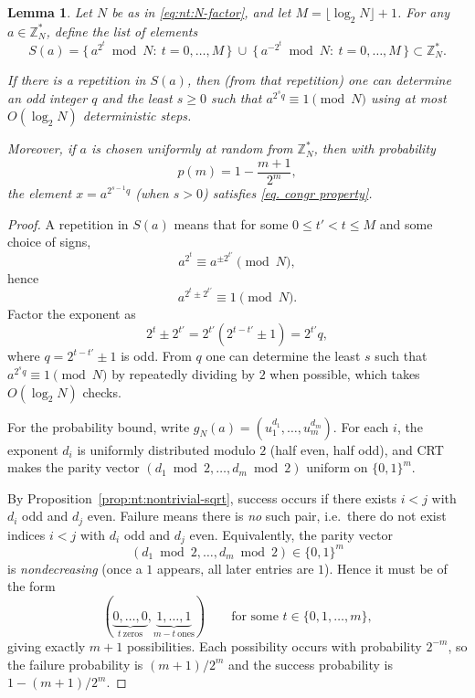\documentclass[11pt,reqno]{article}
\numberwithin{equation}{section}
\theoremstyle{plain}
\newtheorem{lemma}[theorem]{Lemma}
\theoremstyle{definition}
\theoremstyle{remark}
\begin{document}
\medskip
\begin{lemma}\label{lem:nt:repetitions}
Let $N$ be as in \eqref{eq:nt:N-factor}, and let $M=\lfloor \log_2 N\rfloor+1$.
For any $a\in\mathbb{Z}_N^\ast$, define the list of elements
\[
S(a)=\{\,a^{2^t}\bmod N:\ t=0,\dots,M\,\}\ \cup\ \{\,a^{-2^t}\bmod N:\ t=0,\dots,M\,\}
\subset \mathbb{Z}_N^\ast.
\]

If there is a repetition in $S(a)$, then (from that repetition) one can determine an odd integer $q$
and the least $s\ge 0$ such that $a^{2^s q}\equiv 1\pmod N$ using at most $O(\log_2 N)$ deterministic steps.

Moreover, if $a$ is chosen uniformly at random from $\mathbb{Z}_N^\ast$, then with probability
\[
p(m)=1-\frac{m+1}{2^m},
\]
the element $x=a^{2^{s-1}q}$ (when $s>0$) satisfies \eqref{eq. congr property}.
\end{lemma}

\begin{proof}
A repetition in $S(a)$ means that for some $0\le t'<t\le M$ and some choice of signs,
\[
a^{2^t}\equiv a^{\pm 2^{t'}}\pmod N,
\]
hence
\[
a^{2^t\pm 2^{t'}}\equiv 1\pmod N.
\]
Factor the exponent as
\[
2^t\pm 2^{t'} = 2^{t'}(2^{t-t'}\pm 1)=2^{t'}q,
\]
where $q=2^{t-t'}\pm 1$ is odd.  From $q$ one can determine the least $s$ such that
$a^{2^s q}\equiv 1\pmod N$ by repeatedly dividing by $2$ when possible, which takes $O(\log_2 N)$ checks.

For the probability bound, write $g_N(a)=(u_1^{d_1},\dots,u_m^{d_m})$.
For each $i$, the exponent $d_i$ is uniformly distributed modulo $2$ (half even, half odd),
and CRT makes the parity vector $(d_1\bmod 2,\dots,d_m\bmod 2)$ uniform on $\{0,1\}^m$.

By Proposition~\ref{prop:nt:nontrivial-sqrt}, success occurs if there exists $i<j$ with $d_i$ odd and $d_j$ even.
Failure means there is \emph{no} such pair, i.e.\ there do not exist indices $i<j$ with
$d_i$ odd and $d_j$ even. Equivalently, the parity vector
\[
(d_1\bmod 2,\dots,d_m\bmod 2)\in\{0,1\}^m
\]
is \emph{nondecreasing} (once a $1$ appears, all later entries are $1$). Hence it must be of the form
\[
(\underbrace{0,\dots,0}_{t\ \text{zeros}},\underbrace{1,\dots,1}_{m-t\ \text{ones}})
\qquad\text{for some }t\in\{0,1,\dots,m\},
\]
giving exactly $m+1$ possibilities. Each possibility occurs with probability $2^{-m}$, so the failure probability is
$(m+1)/2^{m}$ and the success probability is $1-(m+1)/2^m$.
\end{proof}
\end{document}
